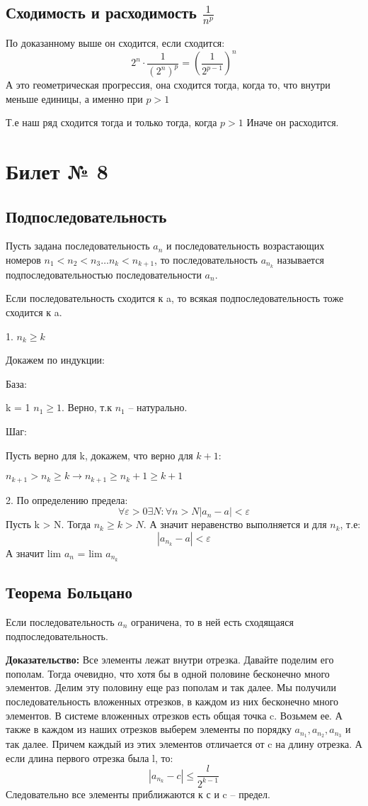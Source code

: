 \documentclass[a4paper,12pt]{article}
\begin{document}
\subsection*{Сходимость и расходимость $\frac{1}{n^p}$}
По доказанному выше он сходится, если сходится:
\[
2^n \cdot \frac{1}{(2^{n})^p} = \left( \frac{1}{2^{p-1}} \right)^n
\]
А это геометрическая прогрессия, она сходится тогда, когда то, что внутри меньше единицы, а именно при $p > 1$

Т.е наш ряд сходится тогда и только тогда, когда  $p > 1 $ Иначе он расходится.
\newpage
\section*{Билет № 8}
\subsection*{Подпоследовательность}

Пусть задана последовательность $a_n$ и последовательность возрастающих номеров $n_1 < n_2 < n_3 \ldots n_k < n_{k+1}$, то последовательность $a_{n_k} $ называется подпоследовательностью последовательности $a_n$.

Если последовательность сходится к a, то всякая подпоследовательность тоже сходится к a. 

1. $n_k \geq k$

Докажем по индукции:

База:

k = 1 $n_1 \geq 1$. Верно, т.к $n_1$ -- натурально.

Шаг:

Пусть верно для k, докажем, что верно для $k +1$:

$n_{k+1} > n_k \geq k \rightarrow n_{k+1} \geq n_k + 1 \geq k + 1$

2. По определению предела:
\[
\forall \varepsilon > 0 \exists N : \forall n > N |a_n - a| < \varepsilon
\]
Пусть k > N. Тогда $n_k \geq k > N$. А значит неравенство выполняется и для $n_k$, т.е:
\[
|a_{n_k} - a | < \varepsilon
\]
А значит lim $a_n$ = lim $a_{n_k}$
\subsection*{Теорема Больцано}
Если последовательность $a_n$ ограничена, то в ней есть сходящаяся подпоследовательность.

\textbf{Доказательство:}
Все элементы лежат внутри отрезка. Давайте поделим его пополам. Тогда очевидно, что хотя бы в одной половине бесконечно много элементов. Делим эту половину еще раз пополам и так далее. Мы получили последовательность вложенных отрезков, в каждом из них бесконечно много элементов. В системе вложенных отрезков есть общая точка c. Возьмем ее. А также в каждом из наших отрезков выберем элементы по порядку $a_{n_1}, a_{n_2}, a_{n_3}$ и так далее. Причем каждый из этих элементов отличается от c на длину отрезка. А если длина первого отрезка была l, то:
\[
|a_{n_k} - c | \leq \frac{l}{2^{k-1}}
\]
Следовательно все элементы приближаются к  с и c -- предел.
\end{document}
